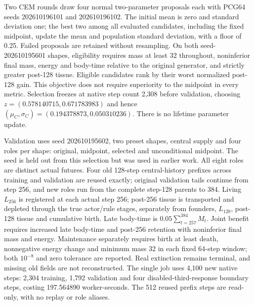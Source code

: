 Two CEM rounds draw four normal two-parameter proposals each with PCG64 seeds 202610196101 and 202610196102. The initial mean is zero and standard deviation one; the best two among all evaluated candidates, including the fixed midpoint, update the mean and population standard deviation, with a floor of 0.25. Failed proposals are retained without resampling. On both seed-202610195601 shapes, eligibility requires mass at least 32 throughout, noninferior final mass, energy and body-time relative to the original generator, and strictly greater post-128 tissue. Eligible candidates rank by their worst normalized post-128 gain. This objective does not require superiority to the midpoint in every metric. Selection freezes at native step count 2,308 before validation, choosing $z=(0.578140715,0.671783983)$ and hence $(\mu_C,\sigma_C)=(0.194378873,0.050310236)$. There is no lifetime parameter update.

Validation uses seed 202610195602, two preset shapes, central supply and four roles per shape: original, midpoint, selected and unconditional midpoint. The seed is held out from this selection but was used in earlier work. All eight roles are distinct actual futures. Four old 128-step central-history prefixes across training and validation are reused exactly; original validation tails continue from step 256, and new roles run from the complete step-128 parents to 384. Living $L_{256}$ is registered at each actual step 256; post-256 tissue is transported and depleted through the true actor/rule stages, separately from founders, $L_{128}$, post-128 tissue and cumulative birth. Late body-time is $0.05\sum_{t=257}^{384}M_t$. Joint benefit requires increased late body-time and post-256 retention with noninferior final mass and energy. Maintenance separately requires birth at least death, nonnegative energy change and minimum mass 32 in each fixed 64-step window; both $10^{-8}$ and zero tolerance are reported. Real extinction remains terminal, and missing old fields are not reconstructed. The single job uses 4,100 new native steps: 2,304 training, 1,792 validation and four disabled-third-response boundary steps, costing 197.564890 worker-seconds. The 512 reused prefix steps are read-only, with no replay or role aliases.

